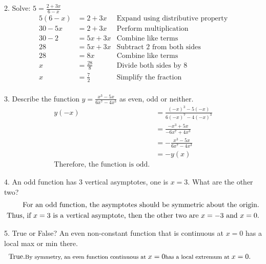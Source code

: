 \documentclass{article}
\newenvironment{solution}{\color{solutioncolor}}{}
\newcommand{\smalltext}[1]{\text{\footnotesize #1}}
\begin{document}
2. Solve: \( 5 = \frac{2 + 3x}{6 - x} \)
\begin{solution}
\begin{align*}
    5(6 - x) &= 2 + 3x & \text{Expand using distributive property} \\
    30 - 5x &= 2 + 3x & \text{Perform multiplication} \\
    30 - 2 &= 5x + 3x & \text{Combine like terms} \\
    28 &= 5x + 3x & \text{Subtract 2 from both sides} \\
    28 &= 8x & \text{Combine like terms} \\
    x &= \frac{28}{8} & \text{Divide both sides by 8} \\
    x &= \frac{7}{2} & \text{Simplify the fraction} \\
\end{align*} 
    \end{solution}

3. Describe the function \( y=\frac{x^3-5x}{6x^7-4x^3} \) as even, odd or neither.
    \begin{solution}
    \begin{align*}
    y(-x) &= \frac{(-x)^3-5(-x)}{6(-x)^7-4(-x)^3} \\
          &= \frac{-x^3+5x}{-6x^7+4x^3} \\
          &= -\frac{x^3-5x}{6x^7-4x^3} \\
          &= -y(x) \\
    \text{Therefore, the function is odd.}
\end{align*}
    \end{solution}

4. An odd function has 3 vertical asymptotes, one is \( x=3 \). What are the other two?
\begin{solution}
    \begin{align*}
    \text{For an odd function, the asymptotes should be symmetric about the origin.} \\
    \text{Thus, if \( x=3 \) is a vertical asymptote, then the other two are \( x=-3 \) and \( x=0 \).}
\end{align*}
\end{solution}

5. True or False? An even non-constant function that is continuous at \( x = 0 \) has a local max or min there.
\begin{solution}
    \begin{align*}
    &\text{True.} \smalltext{ By symmetry, an even function continuous at } x = 0 \smalltext{ has a local extremum at } x = 0.
\end{align*}
\end{solution}
\end{document}
